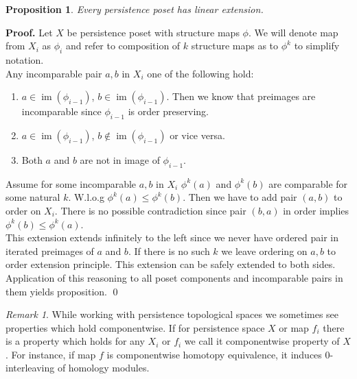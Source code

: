 \documentclass[a4paper, 12pt]{article}
\newtheorem{proposition}{Proposition}
\theoremstyle{definition}
\theoremstyle{remark}
\newtheorem{remark}{Remark}
\newenvironment{pf}{\noindent\textbf{Proof.}}{\qed}
\renewcommand{\leq}{\leqslant}
\begin{document}
\begin{proposition}
  Every persistence poset has linear extension.
\end{proposition}

\begin{pf}
  Let $X$ be persistence poset with structure maps $\phi$. We will denote map from $X_i$ as $\phi_i$ and refer to composition of $k$ structure maps as to $\phi^k$ to simplify notation.\\

  Any incomparable pair $a,b$ in $X_i$ one of the following hold:\\
  \begin{enumerate}
    \item $a \in \operatorname{im}(\phi_{i-1})$, $b \in \operatorname{im}(\phi_{i-1})$. Then we know that preimages are incomparable since $\phi_{i-1}$ is order preserving.
    \item $a \in \operatorname{im}(\phi_{i-1})$, $b \not\in \operatorname{im}(\phi_{i-1})$ or vice versa.
    \item Both $a$ and $b$ are not in image of $\phi_{i-1}$.
  \end{enumerate}

  Assume for some incomparable $a,b$ in $X_i$ $\phi^k(a)$ and $\phi^k(b)$ are comparable for some natural $k$. W.l.o.g $\phi^k(a) \leq \phi^k(b)$. Then we have to add pair $(a,b)$ to order on $X_i$. There is no possible contradiction since pair $(b,a)$ in order implies $\phi^k(b) \leq \phi^k(a)$.\\
  This extension extends infinitely to the left since we never have ordered pair in iterated preimages of $a$ and $b$. If there is no such $k$ we leave ordering on $a,b$ to order extension principle. This extension can be safely extended to both sides.\\

  Application of this reasoning to all poset components and incomparable pairs in them yields proposition.
\end{pf}

\begin{remark}
  While working with persistence topological spaces we sometimes see properties which hold componentwise. If for persistence space $X$ or map $f_i$ there is a property which holds for any $X_i$ or $f_i$ we call it componentwise property of $X$. For instance, if map $f$ is componentwise homotopy equivalence, it induces $0$-interleaving of homology modules.
\end{remark}
\end{document}
